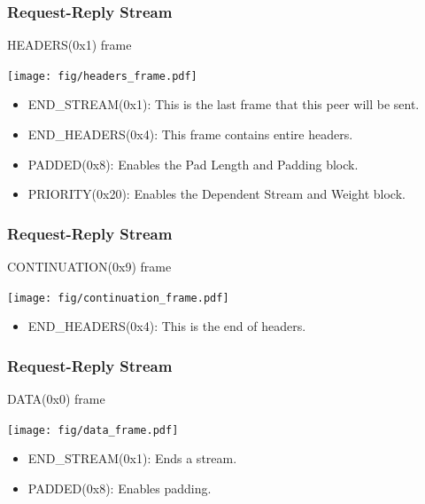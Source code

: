 \documentclass[lualatex]{beamer}
\begin{document}
\begin{frame}
  \frametitle{Request-Reply Stream}

  \begin{block}{HEADERS(0x1) frame}
    \begin{center}
      \texttt{[image: fig/headers\_frame.pdf]}
    \end{center}
    \begin{itemize}
    \item END\_STREAM(0x1): This is the last frame that this peer will be sent.
    \item END\_HEADERS(0x4): This frame contains entire headers.
    \item PADDED(0x8): Enables the Pad Length and Padding block.
    \item PRIORITY(0x20): Enables the Dependent Stream and Weight block.
    \end{itemize}
  \end{block}
\end{frame}

\begin{frame}
  \frametitle{Request-Reply Stream}

  \begin{block}{CONTINUATION(0x9) frame}
    \begin{center}
      \texttt{[image: fig/continuation\_frame.pdf]}
    \end{center}
    \begin{itemize}
    \item END\_HEADERS(0x4): This is the end of headers.
    \end{itemize}
  \end{block}
\end{frame}

\begin{frame}
  \frametitle{Request-Reply Stream}

  \begin{block}{DATA(0x0) frame}
    \begin{center}
      \texttt{[image: fig/data\_frame.pdf]}
    \end{center}
    \begin{itemize}
    \item END\_STREAM(0x1): Ends a stream.
    \item PADDED(0x8): Enables padding.
    \end{itemize}
  \end{block}
\end{frame}
\end{document}

